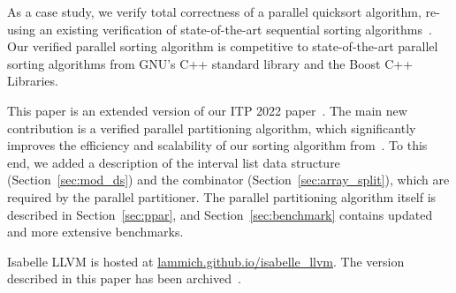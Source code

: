 \documentclass[sn-mathphys,Numbered]{sn-jnl}
\theoremstyle{thmstyleone}%
\theoremstyle{definition}%
\theoremstyle{thmstylethree}%
\begin{document}
As a case study, we verify total correctness of a parallel quicksort algorithm,
re-using an existing verification of state-of-the-art sequential sorting algorithms~\cite{La20}.
Our verified parallel sorting algorithm is competitive to state-of-the-art parallel sorting algorithms
from GNU's C++ standard library and the Boost C++ Libraries.

This paper is an extended version of our ITP 2022 paper~\cite{La22}.
The main new contribution is a verified parallel partitioning algorithm,
which significantly improves the efficiency and scalability of our sorting algorithm from~\cite{La22}.
To this end, we added a description of the interval list data structure (Section~\ref{sec:mod_ds})
and the  combinator (Section~\ref{sec:array_split}), which are required by the parallel partitioner.
The parallel partitioning algorithm itself is described in Section~\ref{sec:ppar}, and Section~\ref{sec:benchmark}
contains updated and more extensive benchmarks.




%
%

Isabelle LLVM is hosted at \href{https://lammich.github.io/isabelle_llvm/index.html}{lammich.github.io/isabelle\_llvm}.
The version described in this paper has been archived~\cite{Isabelle_LLVM_artefact}.
%
\end{document}
